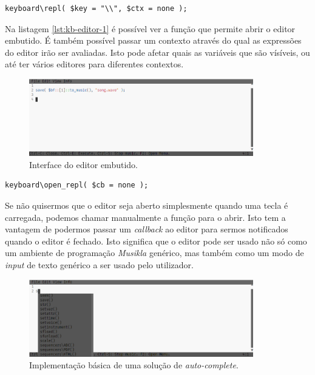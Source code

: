 \begin{lstlisting}[caption={Abre o editor quando a tecla \textbackslash{} é premida},label={lst:kb-editor-1}]
keyboard\repl( $key = "\\", $ctx = none );
\end{lstlisting}

Na listagem \ref{lst:kb-editor-1} é possível ver a função que permite abrir o editor embutido. É também possível passar um contexto através do qual as expressões do editor irão ser avaliadas. Isto pode afetar quais as variáveis que são vísíveis, ou até ter vários editores para diferentes contextos.

\begin{figure}[h]
\begin{center}
    \includegraphics[width=0.87\textwidth]{img/embedded_editor.png}
\end{center}
\caption{Interface do editor embutido.}
\end{figure}

\begin{lstlisting}[caption={Abrir manualmente o editor},label={lst:kb-editor-2}]
keyboard\open_repl( $cb = none );
\end{lstlisting}

Se não quisermos que o editor seja aberto simplesmente quando uma tecla é carregada, podemos chamar manualmente a função para o abrir. Isto tem a vantagem de podermos passar um \textit{callback} ao editor para sermos notificados quando o editor é fechado. 
Isto significa que o editor pode ser usado não só como um ambiente de programação \textit{Musikla} genérico, mas também como um modo de \textit{input} de texto genérico a ser usado pelo utilizador.

\begin{figure}[h]
\begin{center}
    \includegraphics[width=0.87\textwidth]{img/embedded_editor_autocomplete.png}
\end{center}
\caption{Implementação básica de uma solução de \textit{auto-complete}.}
\end{figure}

